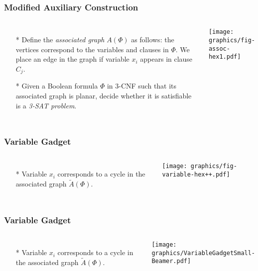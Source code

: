\documentclass{beamer}
\begin{document}
\begin{frame} \frametitle{Modified Auxiliary Construction}
    \begin{columns}[c]
        \begin{itemize}
            \item[*] Define the \textit{associated graph} $A(\Phi)$ as follows: the vertices correspond to the variables and clauses in $\Phi$.   
We place an edge in the graph if variable $x_i$ appears in clause $C_j$.
            \item[*] Given a Boolean formula $\Phi$ in 3-CNF such that its associated graph is planar, decide whether it 
is satisfiable is a \textit{3-SAT problem}.
        \end{itemize}
        \begin{minipage}{\linewidth}
            \begin{center}
            \texttt{[image: graphics/fig-assoc-hex1.pdf]}
            \end{center}
        \end{minipage}
    \end{columns}
\end{frame}
\begin{frame} \frametitle{Variable Gadget}
    \begin{columns}[c]
        \begin{itemize}
            \item[*] Variable $x_i$ corresponds to a cycle in the associated graph $\tilde{A}(\Phi)$. 
        \end{itemize}
                    \begin{minipage}{\linewidth}
            \begin{center}
            \texttt{[image: graphics/fig-variable-hex++.pdf]}
            \end{center}
        \end{minipage}
    \end{columns}
\end{frame}

\begin{frame} \frametitle{Variable Gadget}
    \begin{columns}[c]
        \begin{itemize}
            \item[*] Variable $x_i$ corresponds to a cycle in the associated graph $\tilde{A}(\Phi)$. 
        \end{itemize}
                    \begin{minipage}{\linewidth}
            \begin{center}
            \texttt{[image: graphics/VariableGadgetSmall-Beamer.pdf]}
            \end{center}
        \end{minipage}
    \end{columns}
\end{frame}
\end{document}
